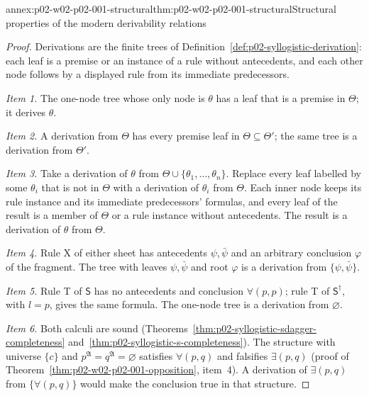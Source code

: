 \begin{annexitem}{annex:p02-w02-p02-001-structural}{thm:p02-w02-p02-001-structural}{Structural properties of the modern derivability relations}
\begin{proof}
Derivations are the finite trees of
Definition~\ref{def:p02-syllogistic-derivation}: each leaf is a premise or
an instance of a rule without antecedents, and each other node follows by
a displayed rule from its immediate predecessors.

\emph{Item 1.} The one-node tree whose only node is \(\theta\) has a leaf
that is a premise in \(\Theta\); it derives \(\theta\).

\emph{Item 2.} A derivation from \(\Theta\) has every premise leaf in
\(\Theta\subseteq\Theta'\); the same tree is a derivation from \(\Theta'\).

\emph{Item 3.} Take a derivation of \(\theta\) from
\(\Theta\cup\{\theta_1,\ldots,\theta_n\}\). Replace every leaf labelled by
some \(\theta_i\) that is not in \(\Theta\) with a derivation of
\(\theta_i\) from \(\Theta\). Each inner node keeps its rule instance and
its immediate predecessors' formulas, and every leaf of the result is a
member of \(\Theta\) or a rule instance without antecedents. The result
is a derivation of \(\theta\) from \(\Theta\).

\emph{Item 4.} Rule X of either sheet has antecedents \(\psi,\bar\psi\) and
an arbitrary conclusion \(\varphi\) of the fragment. The tree with leaves
\(\psi,\bar\psi\) and root \(\varphi\) is a derivation from
\(\{\psi,\bar\psi\}\).

\emph{Item 5.} Rule T of \(\mathsf S\) has no antecedents and conclusion
\(\forall(p,p)\); rule T of \(\mathsf S^\dagger\), with \(l=p\), gives the
same formula. The one-node tree is a derivation from \(\varnothing\).

\emph{Item 6.} Both calculi are sound
(Theorems~\ref{thm:p02-syllogistic-sdagger-completeness}
and~\ref{thm:p02-syllogistic-s-completeness}). The structure with universe
\(\{c\}\) and \(p^{\mathfrak A}=q^{\mathfrak A}=\varnothing\) satisfies
\(\forall(p,q)\) and falsifies \(\exists(p,q)\)
(proof of Theorem~\ref{thm:p02-w02-p02-001-opposition}, item~4). A
derivation of \(\exists(p,q)\) from \(\{\forall(p,q)\}\) would make the
conclusion true in that structure.
\end{proof}
\end{annexitem}
